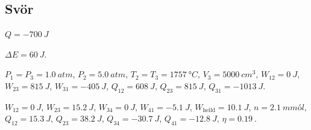 \subsection*{Svör}

\begin{enumerate*}[label = \vspace{0.15cm} \textbf{(\arabic*)}]
\setcounter{enumi}{13}
  \item $Q= \SI{-700}{J}$
  \item $\Delta E = \SI{60}{J}$.
  \item $P_1 = P_3 = \SI{1.0}{atm}$, $P_2 = \SI{5.0}{atm}$, $T_2 = T_3 = \SI{1757}{\degree C}$, $V_3 = \SI{5000}{cm^3}$, $W_{12} = \SI{0}{J}$, $W_{23} = \SI{815}{J}$, $W_{31} = \SI{-405}{J}$, $Q_{12} = \SI{608}{J}$, $Q_{23} = \SI{815}{J}$, $Q_{31} = \SI{-1013}{J}$.
  \item $W_{12} = \SI{0}{J}$, $W_{23} = \SI{15.2}{J}$, $W_{34} = \SI{0}{J}$, $W_{41} = \SI{-5.1}{J}$, $W_{\text{heild}} = \SI{10.1}{J}$, $n = \SI{2.1}{mmól}$, $Q_{12} = \SI{15.3}{J}$, $Q_{23} = \SI{38.2}{J}$, $Q_{34} = \SI{-30.7}{J}$, $Q_{41} = \SI{-12.8}{J}$, $\eta = \SI{0.19}{}$.
\end{enumerate*}


\newpage